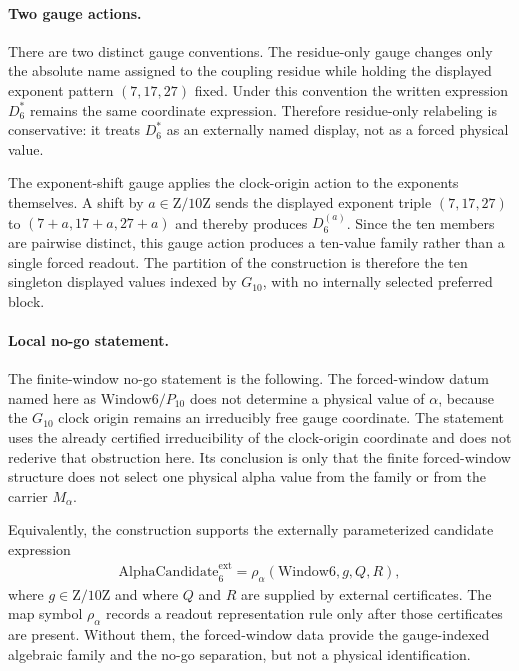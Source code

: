\paragraph{Two gauge actions.}
There are two distinct gauge conventions.  The residue-only gauge changes only the absolute name assigned to the coupling residue while holding the displayed exponent pattern $(7,17,27)$ fixed.  Under this convention the written expression $D_{6}^{*}$ remains the same coordinate expression.  Therefore residue-only relabeling is conservative: it treats $D_{6}^{*}$ as an externally named display, not as a forced physical value.

The exponent-shift gauge applies the clock-origin action to the exponents themselves.  A shift by $a\in \mathrm{Z}/10\mathrm{Z}$ sends the displayed exponent triple $(7,17,27)$ to $(7+a,17+a,27+a)$ and thereby produces $D_{6}^{(a)}$.  Since the ten members are pairwise distinct, this gauge action produces a ten-value family rather than a single forced readout.  The partition of the construction is therefore the ten singleton displayed values indexed by $G_{10}$, with no internally selected preferred block.

\paragraph{Local no-go statement.}
The finite-window no-go statement is the following.  The forced-window datum named here as $\mathrm{Window6}/P_{10}$ does not determine a physical value of $\alpha$, because the $G_{10}$ clock origin remains an irreducibly free gauge coordinate.  The statement uses the already certified irreducibility of the clock-origin coordinate and does not rederive that obstruction here.  Its conclusion is only that the finite forced-window structure does not select one physical alpha value from the family or from the carrier $M_{\alpha}$.

Equivalently, the construction supports the externally parameterized candidate expression
$$
\begin{aligned}
\mathrm{AlphaCandidate}_{6}^{\mathrm{ext}}=\rho_{\alpha}(\mathrm{Window6},g,Q,R),
\end{aligned}
$$
where $g\in \mathrm{Z}/10\mathrm{Z}$ and where $Q$ and $R$ are supplied by external certificates.  The map symbol $\rho_{\alpha}$ records a readout representation rule only after those certificates are present.  Without them, the forced-window data provide the gauge-indexed algebraic family and the no-go separation, but not a physical identification.

